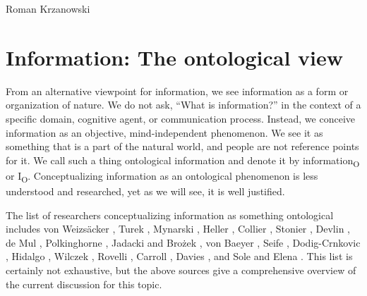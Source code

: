 \begin{artengenv}{Roman Krzanowski}
\section{Information: The ontological view}
From an alternative viewpoint for information, we see information as a form or organization of nature. We do not ask, ``What is information?'' in the context of a specific domain, cognitive agent, or communication process. Instead, we conceive information as an objective, mind-independent phenomenon. We see it as something that is a part of the natural world, and people are not reference points for it. We call such a thing ontological information and denote it by information\textsubscript{O} or I\textsubscript{O}. Conceptualizing information as an ontological phenomenon is less understood and researched, yet as we will see, it is well justified.

The list of researchers conceptualizing information as something ontological includes von Weizsäcker
\parencite*[][]{weizsacker_einheit_1971}, %
 Turek 
\parencite*[][]{turek_filozoficzne_1978}, %
 Mynarski 
\parencite*[][]{mynarski_elementy_1981}, %
 Heller 
\parencites*[][]{heller_ewolucja_1987}[][]{heller_elementy_2014}, %
 Collier 
\parencite*[][]{hanson_intrinsic_1990}, %
 Stonier 
\parencite*[][]{stonier_information_1990}, %
 Devlin 
\parencite*[][]{devlin_logic_1991}, %
 de Mul 
\parencite*[][]{mul_informatization_1999}, %
 Polkinghorne 
\parencite*[][]{polkinghorne_faith_2000}, %
 Jadacki and Brożek 
\parencite*[][]{heller_na_2005}, %
 von Baeyer 
\parencite*[][]{baeyer_information_2005}, %
 Seife 
\parencite*[][]{seife_decoding_2006}, %
 Dodig-Crnkovic 
\parencite*[][]{dodig-crnkovic_alan_2012}, %
 Hidalgo 
\parencite*[][]{hidalgo_why_2015}, %
 Wilczek 
\parencite*[][]{wilczek_beautiful_2015}, %
 Rovelli 
\parencite*[][]{rovelli_meaning_2016}, %
 Carroll 
\parencite*[][]{carroll_big_2017}, %
 Davies 
\parencite*[][]{davies_demon_2019}, %
 and Sole and Elena 
\parencite*[][]{sole_viruses_2019}. %
 This list is certainly not exhaustive, but the above sources give a comprehensive overview of the current discussion for this topic.


\end{artengenv}
